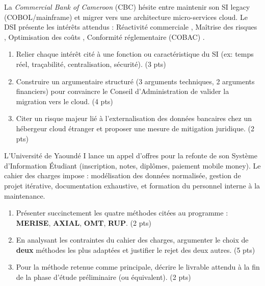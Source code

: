 \documentclass[11pt]{article}
\begin{document}
\begin{exercice}
La \textit{Commercial Bank of Cameroon} (CBC) hésite entre maintenir son SI legacy (COBOL/mainframe) et migrer vers une architecture micro-services cloud. Le DSI présente les intérêts attendus : \og Réactivité commerciale \fg, \og Maîtrise des risques \fg, \og Optimisation des coûts \fg, \og Conformité réglementaire (COBAC) \fg.
\begin{enumerate}
    \item Relier chaque intérêt cité à une fonction ou caractéristique du SI (ex: temps réel, traçabilité, centralisation, sécurité). (3 pts)
    \item Construire un argumentaire structuré (3 arguments techniques, 2 arguments financiers) pour convaincre le Conseil d'Administration de valider la migration vers le cloud. (4 pts)
    \item Citer un risque majeur lié à l'externalisation des données bancaires chez un hébergeur cloud étranger et proposer une mesure de mitigation juridique. (2 pts)
\end{enumerate}
\end{exercice}

\begin{exercice}
L'Université de Yaoundé I lance un appel d'offres pour la refonte de son Système d'Information Étudiant (inscription, notes, diplômes, paiement mobile money). Le cahier des charges impose : modélisation des données normalisée, gestion de projet itérative, documentation exhaustive, et formation du personnel interne à la maintenance.
\begin{enumerate}
    \item Présenter succinctement les quatre méthodes citées au programme : \textbf{MERISE}, \textbf{AXIAL}, \textbf{OMT}, \textbf{RUP}. (2 pts)
    \item En analysant les contraintes du cahier des charges, argumenter le choix de \textbf{deux} méthodes les plus adaptées et justifier le rejet des deux autres. (5 pts)
    \item Pour la méthode retenue comme principale, décrire le livrable attendu à la fin de la phase d'étude préliminaire (ou équivalent). (2 pts)
\end{enumerate}
\end{exercice}
\end{document}
